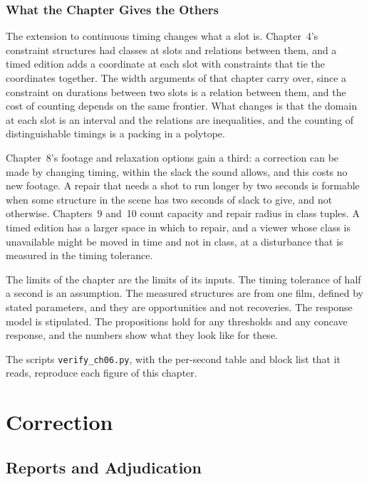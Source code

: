 \documentclass[11pt,twoside,openright]{book}
\theoremstyle{plain}
\theoremstyle{definition}
\theoremstyle{remark}
\begin{document}
\section{What the Chapter Gives the Others}\label{sec:gives6}

The extension to continuous timing changes what a slot is. Chapter~4's constraint structures had classes at slots and relations between them, and a timed edition adds a coordinate at each slot with constraints that tie the coordinates together. The width arguments of that chapter carry over, since a constraint on durations between two slots is a relation between them, and the cost of counting depends on the same frontier. What changes is that the domain at each slot is an interval and the relations are inequalities, and the counting of distinguishable timings is a packing in a polytope.

Chapter~8's footage and relaxation options gain a third: a correction can be made by changing timing, within the slack the sound allows, and this costs no new footage. A repair that needs a shot to run longer by two seconds is formable when some structure in the scene has two seconds of slack to give, and not otherwise. Chapters~9 and~10 count capacity and repair radius in class tuples. A timed edition has a larger space in which to repair, and a viewer whose class is unavailable might be moved in time and not in class, at a disturbance that is measured in the timing tolerance.

The limits of the chapter are the limits of its inputs. The timing tolerance of half a second is an assumption. The measured structures are from one film, defined by stated parameters, and they are opportunities and not recoveries. The response model is stipulated. The propositions hold for any thresholds and any concave response, and the numbers show what they look like for these.

The scripts \texttt{verify\_ch06.py}, with the per-second table and block list that it reads, reproduce each figure of this chapter.

\part{Correction}

\chapter{Reports and Adjudication}
\label{ch:reports}
\end{document}
